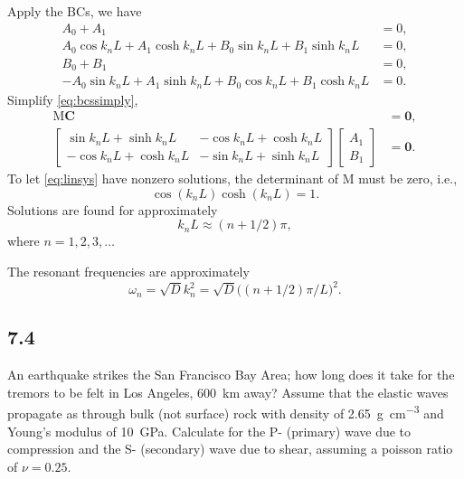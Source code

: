 \documentclass[12pt]{article}
\begin{document}
Apply the BCs, we have
\begin{equation}\label{eq:bcssimply}
  \begin{aligned}
    A_0 + A_1                                                            & = 0, \\
    A_0 \cos k_n L + A_1 \cosh k_n L + B_0 \sin k_n L + B_1 \sinh k_n L  & =0,  \\
    B_0 + B_1                                                            & = 0, \\
    -A_0 \sin k_n L + A_1 \sinh k_n L + B_0 \cos k_n L + B_1 \cosh k_n L & =0.
  \end{aligned}
\end{equation}
Simplify \eqref{eq:bcssimply},
\begin{align}
  \mathrm{ M } \bm{C}       & = \bm{0}, \label{eq:linsys} \\
  \begin{bmatrix}
    \sin k_n L + \sinh k_n L  & -\cos k_n L + \cosh k_n L \\
    -\cos k_n L + \cosh k_n L & -\sin k_n L + \sinh k_n L
  \end{bmatrix}
  \begin{bmatrix}
    A_1 \\
    B_1
  \end{bmatrix} & = \bm{0}.
\end{align}
To let \eqref{eq:linsys} have nonzero solutions,
the determinant of $\mathrm{ M }$ must be zero, i.e.,
\begin{equation}
  \cos ( k_n L ) \cosh ( k_n L ) = 1.
\end{equation}
Solutions are found for approximately
\begin{equation}
  k_n L \approx (n + 1 / 2) \pi,
\end{equation}
where $n = 1, 2, 3, \ldots$

The resonant frequencies are approximately
\begin{equation}
  \omega_n = \sqrt{D} k_n^2 = \sqrt{D} \big( (n + 1 / 2) \pi / L \big)^2.
\end{equation}

\subsection{7.4}
An earthquake strikes the San Francisco Bay Area;
how long does it take for the tremors to be felt in Los Angeles, \SI{600}{\kilo\meter} away?
Assume that the elastic waves propagate as through bulk (not surface) rock with density
of \SI{2.65}{\gram \per \cubic \centi \meter} and Young's modulus of \SI{10}{\giga\pascal}.
Calculate for the P- (primary) wave due to compression and the
S- (secondary) wave due to shear, assuming a poisson ratio of $\nu= 0.25$.
\end{document}
